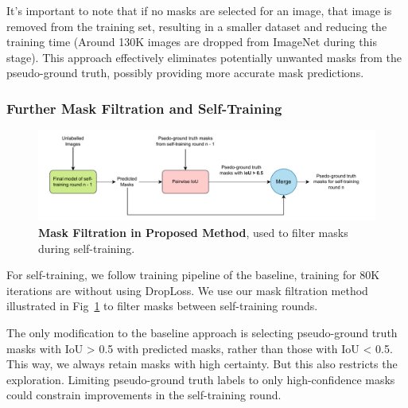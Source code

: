 It’s important to note that if no masks are selected for an image, that image is removed from the training set, resulting in a smaller dataset and reducing the training time (Around 130K images are dropped from ImageNet during this stage). This approach effectively eliminates potentially unwanted masks from the pseudo-ground truth, possibly providing more accurate mask predictions.

\subsubsection{Further Mask Filtration and Self-Training}
\label{section:proposed_mask_filtration_self_training}
\begin{figure}
	\centering
	\includegraphics[width=1\textwidth]{Images/main/our_filtration_self_training.pdf}
	\caption[\textbf{Mask Filtration in Proposed Method During Self-Training}]{\textbf{Mask Filtration in Proposed Method}, used to filter masks during self-training.}
	\label{fig:our_mask_filtration_self_training}
\end{figure}


 For self-training, we follow training pipeline of the baseline, training for 80K iterations are without using DropLoss. We use our mask filtration method illustrated in Fig~\ref{fig:our_mask_filtration_self_training} to filter masks between self-training rounds. 
 
 The only modification to the baseline approach is selecting pseudo-ground truth masks with IoU > 0.5 with predicted masks, rather than those with IoU < 0.5. This way, we always retain masks with high certainty. But this also restricts the exploration. Limiting pseudo-ground truth labels to only high-confidence masks could constrain improvements in the self-training round. 
 
 
 
